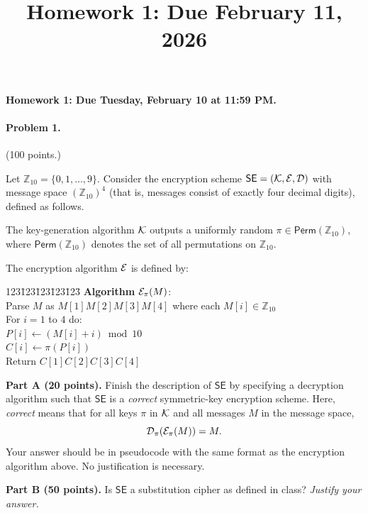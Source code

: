 \documentclass[11pt]{article}
\title{Homework 1: Due February 11, 2026}
\date{}
\newcommand{\Z}{\mathbb{Z}}
\newcommand{\calK}{{\cal K}}
\newcommand{\calD}{{\cal D}}
\newcommand{\calE}{{\cal E}}
\begin{document}
\thispagestyle{fancy}

\paragraph*{Homework 1: Due Tuesday, February 10 at 11:59 PM.}

\paragraph*{Problem 1.} (100 points.)

Let $\Z_{10} = \{0,1,\ldots,9\}$. Consider the encryption scheme
$\mathsf{SE} = (\calK,\calE,\calD)$ with message space $(\Z_{10})^4$
(that is, messages consist of exactly four decimal digits), defined as
follows.

The key-generation algorithm $\calK$ outputs a uniformly random
$\pi \in \mathsf{Perm}(\Z_{10})$, where $\mathsf{Perm}(\Z_{10})$ denotes
the set of all permutations on $\Z_{10}$.

The encryption algorithm $\calE$ is defined by:

\begin{center}
\begin{minipage}{1in}
\begin{tabbing}
123\=123\=123\=123\=123\=\kill
\textbf{Algorithm} $\calE_\pi(M)$:\\
\> Parse $M$ as $M[1]M[2]M[3]M[4]$ where each $M[i] \in \Z_{10}$\\
\> For $i = 1$ to $4$ do:\\
\>\> $P[i] \gets (M[i] + i) \bmod 10$\\
\>\> $C[i] \gets \pi(P[i])$\\
\> Return $C[1]C[2]C[3]C[4]$
\end{tabbing}
\end{minipage}
\end{center}

\noindent
\textbf{Part A (20 points).}
Finish the description of $\mathsf{SE}$ by specifying a decryption
algorithm such that $\mathsf{SE}$ is a \emph{correct} symmetric-key
encryption scheme. Here, \emph{correct} means that for all keys
$\pi$ in  $\calK$ and all messages $M$ in the message space,
\[
\calD_\pi(\calE_\pi(M)) = M .
\]
Your answer should be in pseudocode with the same format as the
encryption algorithm above. No justification is necessary.
\medskip

\noindent
\textbf{Part B (50 points).}
Is $\mathsf{SE}$ a substitution cipher as defined in class?
\emph{Justify your answer.}
\end{document}
